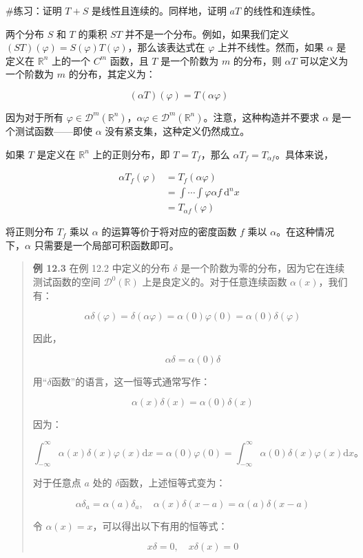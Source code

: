 \#练习：证明 \(T + S\) 是线性且连续的。同样地，证明 \(a T\)
的线性和连续性。

两个分布 \(S\) 和 \(T\) 的乘积 \(S T\)
并不是一个分布。例如，如果我们定义
\((S T)(\varphi) = S(\varphi) T(\varphi)\)，那么该表达式在 \(\varphi\)
上并不线性。然而，如果 \(\alpha\) 是定义在 \(\mathbb{R}^n\) 上的一个
\(C^m\) 函数，且 \(T\) 是一个阶数为 \(m\) 的分布，则 \(\alpha T\)
可以定义为一个阶数为 \(m\) 的分布，其定义为：

\[
(\alpha T)(\varphi) = T(\alpha \varphi)
\]

因为对于所有
\(\varphi \in \mathcal{D}^m(\mathbb{R}^n)\)，\(\alpha \varphi \in \mathcal{D}^m(\mathbb{R}^n)\)。注意，这种构造并不要求
\(\alpha\) 是一个测试函数------即使 \(\alpha\)
没有紧支集，这种定义仍然成立。

如果 \(T\) 是定义在 \(\mathbb{R}^n\) 上的正则分布，即 \(T = T_f\)，那么
\(\alpha T_f = T_{\alpha f}\)。具体来说，

\[
\begin{aligned}
\alpha T_f(\varphi) & = T_f(\alpha \varphi) \\
& = \int \cdots \int \varphi \alpha f \mathrm{~d}^n x \\
& = T_{\alpha f}(\varphi)
\end{aligned}
\]

将正则分布 \(T_f\) 乘以 \(\alpha\) 的运算等价于将对应的密度函数 \(f\)
乘以 \(\alpha\)。在这种情况下，\(\alpha\) 只需要是一个局部可积函数即可。

\begin{quote}
\textbf{例 12.3} 在例 12.2 中定义的分布 \(\delta\)
是一个阶数为零的分布，因为它在连续测试函数的空间
\(\mathcal{D}^0(\mathbb{R})\) 上是良定义的。对于任意连续函数
\(\alpha(x)\)，我们有：

\[
\alpha \delta(\varphi) = \delta(\alpha \varphi) = \alpha(0) \varphi(0) = \alpha(0) \delta(\varphi)
\]

因此，

\[
\alpha \delta = \alpha(0) \delta
\]

用``$\delta$函数''的语言，这一恒等式通常写作：

\[
\alpha(x) \delta(x) = \alpha(0) \delta(x)
\]

因为：

\[
\int_{-\infty}^\infty \alpha(x) \delta(x) \varphi(x) \mathrm{d}x = \alpha(0) \varphi(0) = \int_{-\infty}^\infty \alpha(0) \delta(x) \varphi(x) \mathrm{d}x。
\]

对于任意点 \(a\) 处的 $\delta$函数，上述恒等式变为：

\[
\alpha \delta_a = \alpha(a) \delta_a, \quad \alpha(x) \delta(x-a) = \alpha(a) \delta(x-a)
\]

令 \(\alpha(x) = x\)，可以得出以下有用的恒等式：

\[
x \delta = 0, \quad x \delta(x) = 0
\]
\end{quote}

